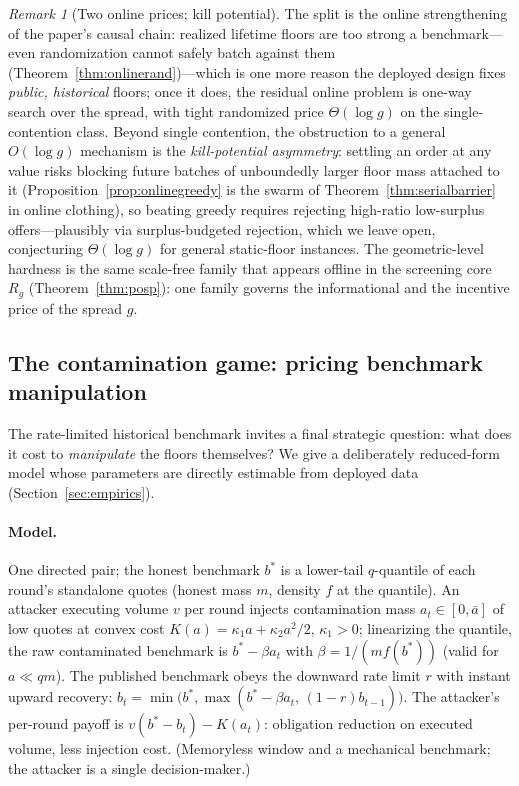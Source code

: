 \documentclass[11pt]{article}
\theoremstyle{remark}
\newtheorem{remark}{Remark}
\begin{document}
\begin{remark}[Two online prices; kill potential]
\label{rem:killpotential}
The split is the online strengthening of the paper's causal chain:
realized lifetime floors are too strong a benchmark---even randomization
cannot safely batch against them (Theorem~\ref{thm:onlinerand})---which
is one more reason the deployed design fixes \emph{public, historical}
floors; once it does, the residual online problem is one-way search over
the spread, with tight randomized price $\Theta(\log g)$ on the
single-contention class. Beyond single contention, the obstruction to a
general $O(\log g)$ mechanism is the \emph{kill-potential asymmetry}:
settling an order at any value risks blocking future batches of
unboundedly larger floor mass attached to it
(Proposition~\ref{prop:onlinegreedy} is the swarm of
Theorem~\ref{thm:serialbarrier} in online clothing), so beating greedy
requires rejecting high-ratio low-surplus offers---plausibly via
surplus-budgeted rejection, which we leave open, conjecturing
$\Theta(\log g)$ for general static-floor instances. The geometric-level
hardness is the same scale-free family that appears offline in the
screening core $R_g$ (Theorem~\ref{thm:posp}): one family governs the
informational and the incentive price of the spread $g$.
\end{remark}

\subsection{The contamination game: pricing benchmark manipulation}
\label{sec:contamination}

The rate-limited historical benchmark invites a final strategic
question: what does it cost to \emph{manipulate} the floors themselves?
We give a deliberately reduced-form model whose parameters are directly
estimable from deployed data (Section~\ref{sec:empirics}).

\paragraph{Model.}
One directed pair; the honest benchmark $b^\ast$ is a lower-tail
$q$-quantile of each round's standalone quotes (honest mass $m$, density
$f$ at the quantile). An attacker executing volume $v$ per round injects
contamination mass $a_t\in[0,\bar a]$ of low quotes at convex cost
$K(a)=\kappa_1a+\kappa_2a^2/2$, $\kappa_1>0$; linearizing the quantile,
the raw contaminated benchmark is $b^\ast-\beta a_t$ with
$\beta=1/(mf(b^\ast))$ (valid for $a\ll qm$). The published benchmark
obeys the downward rate limit $r$ with instant upward recovery:
$b_t=\min\big(b^\ast,\max(b^\ast-\beta a_t,\,(1-r)b_{t-1})\big)$. The
attacker's per-round payoff is $v(b^\ast-b_t)-K(a_t)$: obligation
reduction on executed volume, less injection cost. (Memoryless window
and a mechanical benchmark; the attacker is a single decision-maker.)
\end{document}
